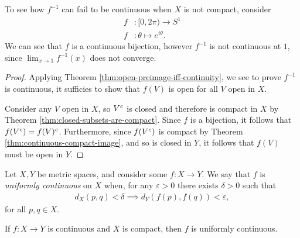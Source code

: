 \begin{exmp}
    To see how $f^{-1}$ can fail to be continuous when $X$ is not compact, consider
    \begin{align*}
        f&: [0, 2\pi) \to S^{1} \\
        f&: \theta \mapsto e^{i\theta}.
    \end{align*}
    We can see that $f$ is a continuous bijection, however $f^{-1}$ is not continuous at $1$, since $\lim_{x \to 1}f^{-1}(x)$ does not converge.
\end{exmp}

\begin{proof}
    Applying Theorem \ref{thm:open-preimage-iff-continuity}, we see to prove $f^{-1}$ is continuous, it sufficies to show that $f(V)$ is open for all $V$ open in $X$.

    Consider any $V$ open in $X$, so $V^{c}$ is closed and therefore is compact in $X$ by Theorem \ref{thm:closed-subsets-are-compact}. Since $f$ is a bijection, it follows that $f(V^{c}) = f(V)^{c}$. Furthermore, since $f(V^{c})$ is compact by Theorem \ref{thm:continuous-compact-image}, and so is closed in $Y$, it follows that $f(V)$ must be open in $Y$.
\end{proof}

\begin{defn}
    Let $X, Y$ be metric spaces, and consider some $f: X \to Y$. We say that $f$ is \emph{uniformly continuous} on $X$ when, for any $\varepsilon > 0$ there exists $\delta > 0$ such that
    \begin{align*}
        d_{X}(p, q) < \delta \implies d_{Y}(f(p), f(q)) < \varepsilon,
    \end{align*}
    for all $p, q \in X$.
\end{defn}

\begin{thm}\label{thm:compact-uniform-continuity}
    If $f: X \to Y$ is continuous and $X$ is compact, then $f$ is uniformly continuous.
\end{thm}

